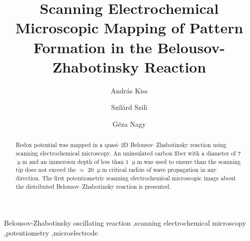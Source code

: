 \documentclass[3p, twocolumn]{elsarticle}
\begin{document}
\begin{frontmatter}

\title{Scanning Electrochemical Microscopic Mapping of Pattern Formation in the Belousov-Zhabotinsky Reaction}
\author[akiss]{András Kiss}
\author[szszilard]{Szilárd Szili}
\address[akiss, gnagy, szszilard]{Department of General and Physical Chemistry, Faculty of Sciences, University of Pécs, 7624 Pécs, Ifjúság útja 6, Hungary}
\address[akiss, gnagy]{János Szentágothai Research Centre, University of Pécs, 7624 Pécs, Ifjúság Útja 20, Hungary}
\author[gnagy]{Géza Nagy}

\begin{abstract}

Redox potential was mapped in a quasi--2D Belousov--Zhabotinsky reaction using scanning electrochemical microscopy.
An uninsulated carbon fiber with a diameter of 7 $\upmu$m and an immersion depth of less than 1 $\upmu$m was used to ensure than the scanning tip does not exceed the $\approx$ 20 $\upmu$m critical radius of wave propagation in any direction.
The first potentiometric scanning electrochemical microscopic image about the distributed Belousov--Zhabotinsky reaction is presented. 




\end{abstract}
\begin{keyword}
	Belousov-Zhabotinsky oscillating reaction \sep scanning electrochemical microscopy \sep potentiometry \sep microelectrode
\end{keyword}
\end{frontmatter}
\end{document}
